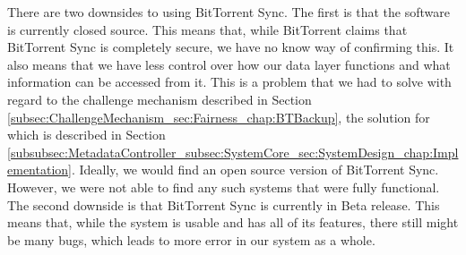 \documentclass[12pt]{report}
\begin{document}
There are two downsides to using BitTorrent Sync. The first is that the software is currently closed source. This means that, while BitTorrent claims that BitTorrent Sync is completely secure, we have no know way of confirming this. It also means that we have less control over how our data layer functions and what information can be accessed from it. This is a problem that we had to solve with regard to the challenge mechanism described in Section \ref{subsec:ChallengeMechanism_sec:Fairness_chap:BTBackup}, the solution for which is described in Section \ref{subsubsec:MetadataController_subsec:SystemCore_sec:SystemDesign_chap:Implementation}. Ideally, we would find an open source version of BitTorrent Sync. However, we were not able to find any such systems that were fully functional. The second downside is that BitTorrent Sync is currently in Beta release. This means that, while the system is usable and has all of its features, there still might be many bugs, which leads to more error in our system as a whole.
\end{document}
